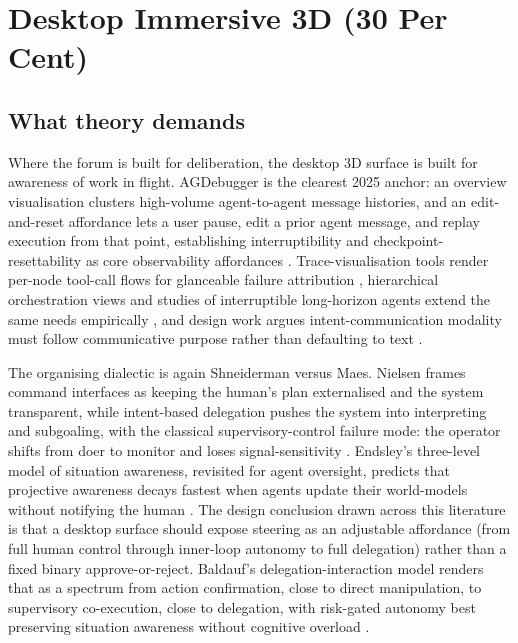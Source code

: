 \section{Desktop Immersive 3D (30 Per Cent)}

\subsection{What theory demands}

Where the forum is built for deliberation, the desktop 3D surface is built for awareness of work in flight. AGDebugger is the clearest 2025 anchor: an overview visualisation clusters high-volume agent-to-agent message histories, and an edit-and-reset affordance lets a user pause, edit a prior agent message, and replay execution from that point, establishing interruptibility and checkpoint-resettability as core observability affordances \parencite{Epperson2025Debugging}. Trace-visualisation tools render per-node tool-call flows for glanceable failure attribution \parencite{XAgen2025}, hierarchical orchestration views and studies of interruptible long-horizon agents extend the same needs empirically \parencite{OrchVis2025, Interruptible2026}, and design work argues intent-communication modality must follow communicative purpose rather than defaulting to text \parencite{IntentComm2025}.

The organising dialectic is again Shneiderman versus Maes. Nielsen frames command interfaces as keeping the human's plan externalised and the system transparent, while intent-based delegation pushes the system into interpreting and subgoaling, with the classical supervisory-control failure mode: the operator shifts from doer to monitor and loses signal-sensitivity \parencite{Nielsen2025Intent}. Endsley's three-level model of situation awareness, revisited for agent oversight, predicts that projective awareness decays fastest when agents update their world-models without notifying the human \parencite{SupervisionTeaming2025}. The design conclusion drawn across this literature is that a desktop surface should expose steering as an adjustable affordance (from full human control through inner-loop autonomy to full delegation) rather than a fixed binary approve-or-reject. Baldauf's delegation-interaction model renders that as a spectrum from action confirmation, close to direct manipulation, to supervisory co-execution, close to delegation, with risk-gated autonomy best preserving situation awareness without cognitive overload \parencite{Baldauf2026Delegation, ControlAbstraction2020}.

